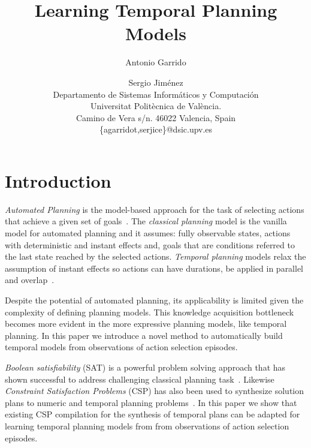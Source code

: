 \documentclass[letterpaper]{article} %
\begin{document}
\title{Learning Temporal Planning Models}

\author{Antonio Garrido\and Sergio Jim\'enez\\
{\small Departamento de Sistemas Inform\'aticos y Computaci\'on}\\
{\small Universitat Polit\`ecnica de Val\`encia.}\\
{\small Camino de Vera s/n. 46022 Valencia, Spain}\\
{\small \{agarridot,serjice\}@dsic.upv.es}}



\maketitle
\begin{abstract}
\end{abstract}


\section{Introduction}
\label{sec:introduction}
{\em Automated Planning} is the model-based approach for the task of selecting actions that achieve a given set of goals~\cite{geffner2013concise}. The {\em classical planning} model is the vanilla model for automated planning and it assumes: fully observable states, actions with deterministic and instant effects and, goals that are conditions referred to the last state reached by the selected actions. {\em Temporal planning} models relax the assumption of instant effects so actions can have durations, be applied in parallel and overlap~\cite{ghallab2004automated}. 

Despite the potential of automated planning, its applicability is limited given the complexity of defining planning models. This knowledge acquisition bottleneck becomes more evident in the more expressive planning models, like temporal planning. In this paper we introduce a novel method to automatically build temporal models from observations of action selection episodes.

{\em Boolean satisfiability} (SAT) is a powerful problem solving approach that has shown successful to address challenging classical planning task~\cite{kautz1999unifying,rintanen2009planning,rintanen2012planning}. Likewise {\em Constraint Satisfaction Problems} (CSP) has also been used to synthesize solution plans to numeric and temporal planning problems~\cite{do2001planning,lopez2003generalizing,vidal2006branching,garrido2009constraint}. In this paper we show that existing CSP compilation for the synthesis of temporal plans can be adapted for learning temporal planning models from from observations of action selection episodes.
\end{document}
